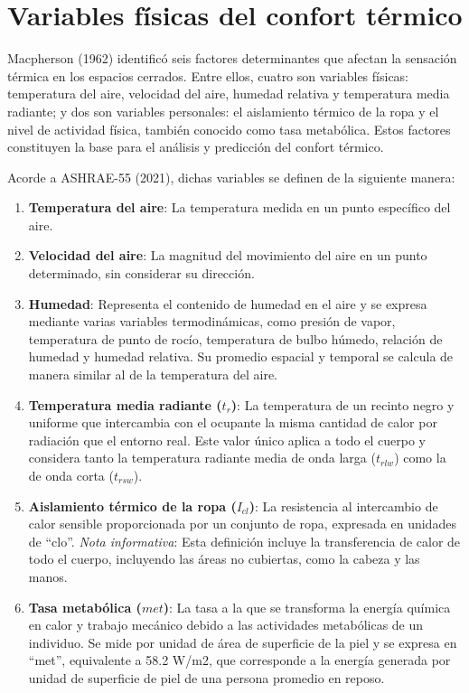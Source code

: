 \documentclass[
  letterpaper,
]{scrbook}
\begin{document}
\section{Variables físicas del confort
térmico}\label{variables-fuxedsicas-del-confort-tuxe9rmico}

Macpherson (1962) identificó seis factores determinantes que afectan la
sensación térmica en los espacios cerrados. Entre ellos, cuatro son
variables físicas: temperatura del aire, velocidad del aire, humedad
relativa y temperatura media radiante; y dos son variables personales:
el aislamiento térmico de la ropa y el nivel de actividad física,
también conocido como tasa metabólica. Estos factores constituyen la
base para el análisis y predicción del confort térmico.

Acorde a ASHRAE-55 (2021), dichas variables se definen de la siguiente
manera:

\begin{enumerate}
\def\labelenumi{\arabic{enumi}.}
\item
  \textbf{Temperatura del aire}: La temperatura medida en un punto
  específico del aire.
\item
  \textbf{Velocidad del aire}: La magnitud del movimiento del aire en un
  punto determinado, sin considerar su dirección.
\item
  \textbf{Humedad}: Representa el contenido de humedad en el aire y se
  expresa mediante varias variables termodinámicas, como presión de
  vapor, temperatura de punto de rocío, temperatura de bulbo húmedo,
  relación de humedad y humedad relativa. Su promedio espacial y
  temporal se calcula de manera similar al de la temperatura del aire.
\item
  \textbf{Temperatura media radiante (\(t_{r}\))}: La temperatura de un
  recinto negro y uniforme que intercambia con el ocupante la misma
  cantidad de calor por radiación que el entorno real. Este valor único
  aplica a todo el cuerpo y considera tanto la temperatura radiante
  media de onda larga (\(t_{rlw}\)) como la de onda corta (\(t_{rsw}\)).
\item
  \textbf{Aislamiento térmico de la ropa (\(I_{cl}\))}: La resistencia
  al intercambio de calor sensible proporcionada por un conjunto de
  ropa, expresada en unidades de ``clo''. \emph{Nota informativa}: Esta
  definición incluye la transferencia de calor de todo el cuerpo,
  incluyendo las áreas no cubiertas, como la cabeza y las manos.
\item
  \textbf{Tasa metabólica (\(met\))}: La tasa a la que se transforma la
  energía química en calor y trabajo mecánico debido a las actividades
  metabólicas de un individuo. Se mide por unidad de área de superficie
  de la piel y se expresa en ``met'', equivalente a 58.2 W/m2, que
  corresponde a la energía generada por unidad de superficie de piel de
  una persona promedio en reposo.
\end{enumerate}
\end{document}
